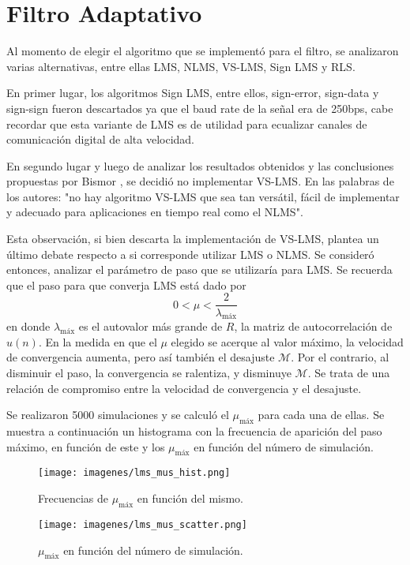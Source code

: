 \documentclass[main.tex]{subfiles}
\begin{document}
\section{Filtro Adaptativo}
Al momento de elegir el algoritmo que se implementó para el filtro, 
se analizaron varias alternativas, entre ellas LMS, NLMS, VS-LMS, Sign LMS y RLS.

En primer lugar, los algoritmos Sign LMS, entre ellos, sign-error, sign-data
y sign-sign fueron descartados ya que el baud rate de la señal era de 250bps,
cabe recordar que esta variante de LMS es de utilidad para ecualizar canales de
comunicación digital de alta velocidad. \newline

En segundo lugar y  luego de analizar 
los resultados obtenidos y las conclusiones propuestas por Bismor \cite{bismor},
se decidió no implementar VS-LMS. En las palabras de los autores: 
"no hay algoritmo VS-LMS que sea tan versátil, fácil de implementar y adecuado 
para aplicaciones en tiempo real como el NLMS".\newline

Esta observación, si bien descarta la implementación de VS-LMS, 
plantea un último debate respecto a si corresponde utilizar LMS o NLMS. 
Se consideró entonces, analizar el parámetro de paso que se utilizaría para LMS. 
Se recuerda que el paso para que converja LMS está dado por
\begin{equation}
    0<\mu<\frac{2}{\lambda_\text{máx}}
\end{equation}
en donde $\lambda_\text{máx}$ es el autovalor más grande de $R$, la matriz de 
autocorrelación de $u(n)$. En la medida en que el  $\mu$ elegido se acerque 
al valor máximo, la velocidad de convergencia aumenta, pero así también el desajuste $\mathscr{M}$.
Por el contrario, al disminuir el paso, la convergencia se ralentiza, y disminuye $\mathscr{M}$. 
Se trata de una relación de compromiso entre la velocidad de convergencia y el desajuste.

Se realizaron 5000 simulaciones y se calculó el $\mu_\text{máx}$ para cada una de ellas.
Se muestra a continuación un histograma con la frecuencia de aparición del paso máximo, 
en función de este y los $\mu_\text{máx}$ en función del número de simulación.
\begin{figure}[H]
    \centering
    \texttt{[image: imagenes/lms\_mus\_hist.png]}
    \caption{Frecuencias de $\mu_\text{máx}$ en función del mismo.}
\end{figure}
\begin{figure}[H]
    \centering
    \texttt{[image: imagenes/lms\_mus\_scatter.png]}
    \caption{$\mu_\text{máx}$ en función del número de simulación.}
\end{figure}
\end{document}
